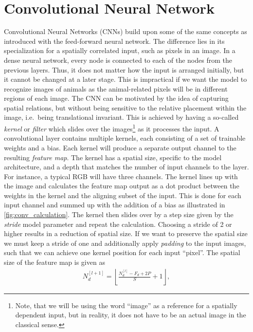 \section{Convolutional Neural Network}\label{sec:CNN}
Convolutional Neural Networks (\acrshort{CNN}s) build upon some of the same
concepts as introduced with the feed-forward neural network. The difference lies
in its specialization for a spatially correlated input, such as pixels in an
image. In a dense neural network, every node is connected to each of the nodes
from the previous layers. Thus, it does not matter how the input is arranged
initially, but it cannot be changed at a later stage. This is
impractical if we want the model to recognize images of animals as the
animal-related pixels will be in different regions of each image. The
\acrshort{CNN} can be motivated by the idea of capturing spatial relations, but without being sensitive to the relative placement within the image, i.e.\ being
translational invariant. This is achieved by having a so-called \textit{kernel}
or \textit{filter} which slides over the images\footnote{Note,
that we will be using the word ``image'' as a reference for a spatially
dependent input, but in reality, it does not have to be an actual image in the
classical sense.} as it processes the input. A convolutional layer contains multiple kernels, each
consisting of a set of trainable weights and a bias. Each kernel will produce a separate output channel to the resulting \textit{feature map}. The kernel has a spatial size, specific to the model architecture, and a depth that matches the number of input channels to the layer. For instance, a typical RGB will have three channels. The kernel lines up with the image and calculates the feature map output as a dot product between the weights in the kernel and the aligning subset of the input. This is done for each input channel and summed up with the addition of a bias as illustrated in \cref{fig:conv_calculation}. The kernel then slides over by a step size given by the \textit{stride} model parameter and repeat the calculation. Choosing a stride of 2 or higher results in a reduction of spatial size. If we want to preserve the spatial size we must keep a stride of one and
additionally apply \textit{padding} to the input images, such that we can
achieve one kernel position for each input ``pixel''. The spatial size of the
feature map is given as
\begin{align}
  N_d^{[l+1]} = \left\lfloor \frac{N_d^{[l]} - F_d + 2P}{S} + 1 \right\rfloor,
  \label{eq:down_scaling}
\end{align}
